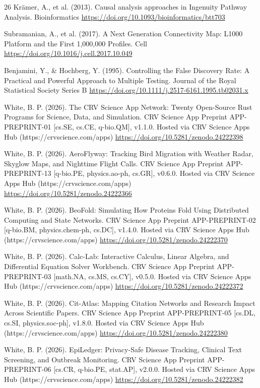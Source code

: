 \documentclass[10pt,letterpaper]{article}
\begin{document}
\begin{thebibliography}{26}
 Krämer, A., et al. (2013). Causal analysis approaches in Ingenuity Pathway Analysis. Bioinformatics \url{https://doi.org/10.1093/bioinformatics/btt703}

 Subramanian, A., et al. (2017). A Next Generation Connectivity Map: L1000 Platform and the First 1,000,000 Profiles. Cell \url{https://doi.org/10.1016/j.cell.2017.10.049}

 Benjamini, Y., \& Hochberg, Y. (1995). Controlling the False Discovery Rate: A Practical and Powerful Approach to Multiple Testing. Journal of the Royal Statistical Society Series B \url{https://doi.org/10.1111/j.2517-6161.1995.tb02031.x}

 White, B. P. (2026). The CRV Science App Network: Twenty Open-Source Rust Programs for Science, Data, and Simulation. CRV Science App Preprint APP-PREPRINT-01 [cs.SE, cs.CE, q-bio.QM], v1.1.0. Hosted via CRV Science Apps Hub (https://crvscience.com/apps) \url{https://doi.org/10.5281/zenodo.24222398}

 White, B. P. (2026). AeroFlyway: Tracking Bird Migration with Weather Radar, Skyglow Maps, and Nighttime Flight Calls. CRV Science App Preprint APP-PREPRINT-13 [q-bio.PE, physics.ao-ph, cs.GR], v0.6.0. Hosted via CRV Science Apps Hub (https://crvscience.com/apps) \url{https://doi.org/10.5281/zenodo.24222366}

 White, B. P. (2026). BeoFold: Simulating How Proteins Fold Using Distributed Computing and State Networks. CRV Science App Preprint APP-PREPRINT-02 [q-bio.BM, physics.chem-ph, cs.DC], v1.4.0. Hosted via CRV Science Apps Hub (https://crvscience.com/apps) \url{https://doi.org/10.5281/zenodo.24222370}

 White, B. P. (2026). Calc-Lab: Interactive Calculus, Linear Algebra, and Differential Equation Solver Workbench. CRV Science App Preprint APP-PREPRINT-03 [math.NA, cs.MS, cs.CY], v0.5.0. Hosted via CRV Science Apps Hub (https://crvscience.com/apps) \url{https://doi.org/10.5281/zenodo.24222372}

 White, B. P. (2026). Cit-Atlas: Mapping Citation Networks and Research Impact Across Scientific Papers. CRV Science App Preprint APP-PREPRINT-05 [cs.DL, cs.SI, physics.soc-ph], v1.8.0. Hosted via CRV Science Apps Hub (https://crvscience.com/apps) \url{https://doi.org/10.5281/zenodo.24222380}

 White, B. P. (2026). EpiLedger: Privacy-Safe Disease Tracking, Clinical Text Screening, and Outbreak Monitoring. CRV Science App Preprint APP-PREPRINT-06 [cs.CR, q-bio.PE, stat.AP], v2.0.0. Hosted via CRV Science Apps Hub (https://crvscience.com/apps) \url{https://doi.org/10.5281/zenodo.24222382}


\end{thebibliography}
\end{document}
